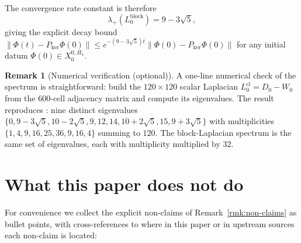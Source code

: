 \documentclass[11pt]{article}
\theoremstyle{definition}
\newtheorem{remark}[theorem]{Remark}
\begin{document}
The convergence rate constant is therefore
\[
  \lambda_{+}(L_0^{\mathrm{block}}) = 9 - 3\sqrt{5},
\]
giving the explicit decay bound
$\bigl\|\Phi(t) - P_{\ker} \Phi(0)\bigr\|
\leq e^{-(9 - 3\sqrt{5}) t}
\bigl\|\Phi(0) - P_{\ker} \Phi(0)\bigr\|$
for any initial datum $\Phi(0) \in X_0^{0, H_4}$.

\begin{remark}[Numerical verification (optional)]
\label{rmk:sim}
A one-line numerical check of the spectrum is straightforward:
build the $120 \times 120$ scalar Laplacian
$L^{\mathrm{cl}}_0 = D_0 - W_0$ from the $600$-cell adjacency
matrix and compute its eigenvalues. The result reproduces
\cite[Table~\texttt{tab:P2-spectrum}]{AlgebraicSubstrate}:
nine distinct eigenvalues $\{0, 9 - 3\sqrt{5}, 10 - 2\sqrt{5},
9, 12, 14, 10 + 2\sqrt{5}, 15, 9 + 3\sqrt{5}\}$ with
multiplicities $\{1, 4, 9, 16, 25, 36, 9, 16, 4\}$ summing to
$120$. The block-Laplacian spectrum is the same set of
eigenvalues, each with multiplicity multiplied by $32$.
\end{remark}

\section{What this paper does not do}
\label{sec:non-claims}

For convenience we collect the explicit non-claims of
Remark~\ref{rmk:non-claims} as bullet points, with cross-references
to where in this paper or in upstream sources each non-claim is
located:
\end{document}
